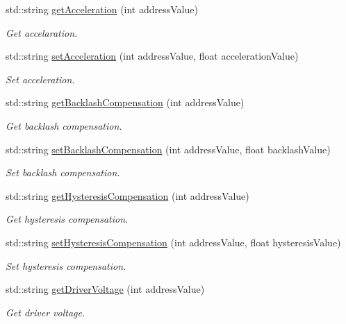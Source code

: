 \begin{DoxyCompactItemize}
\item 
std\+::string \hyperlink{namespaceconex_a9ccf7065a08f5cb5c21c45efcb0c76db}{get\+Acceleration} (int address\+Value)
\begin{DoxyCompactList}\small\item\em Get accelaration. \end{DoxyCompactList}\item 
std\+::string \hyperlink{namespaceconex_ae90d099ece6fb06e8eeb4ab3ad5df2bb}{set\+Acceleration} (int address\+Value, float acceleration\+Value)
\begin{DoxyCompactList}\small\item\em Set acceleration. \end{DoxyCompactList}\item 
std\+::string \hyperlink{namespaceconex_a8c9d7fa13308de3bfa68ea372986d490}{get\+Backlash\+Compensation} (int address\+Value)
\begin{DoxyCompactList}\small\item\em Get backlash compensation. \end{DoxyCompactList}\item 
std\+::string \hyperlink{namespaceconex_a8668932baaa1ff47f4bf37d6dabb1c42}{set\+Backlash\+Compensation} (int address\+Value, float backlash\+Value)
\begin{DoxyCompactList}\small\item\em Set backlash compensation. \end{DoxyCompactList}\item 
std\+::string \hyperlink{namespaceconex_a44852cd57a643f1a70ffff0ba772b28b}{get\+Hysteresis\+Compensation} (int address\+Value)
\begin{DoxyCompactList}\small\item\em Get hysteresis compensation. \end{DoxyCompactList}\item 
std\+::string \hyperlink{namespaceconex_a3a057c09b112f734431cb331669bc46b}{set\+Hysteresis\+Compensation} (int address\+Value, float hysteresis\+Value)
\begin{DoxyCompactList}\small\item\em Set hysteresis compensation. \end{DoxyCompactList}\item 
std\+::string \hyperlink{namespaceconex_a0588a5e5f42da8cb5041900bbfba4243}{get\+Driver\+Voltage} (int address\+Value)
\begin{DoxyCompactList}\small\item\em Get driver voltage. \end{DoxyCompactList}\item 

\end{DoxyCompactItemize}

